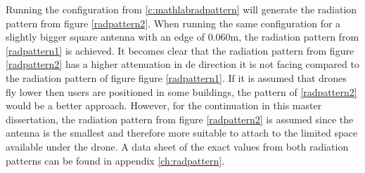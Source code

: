 Running the configuration from \ref{c:mathlabradpattern} will generate the radiation pattern from figure \ref{radpattern2}.
When running the same configuration for a slightly bigger square antenna with an edge of 0.060m, the radiation pattern from \ref{radpattern1} is
achieved. It becomes clear that the radiation pattern from figure \ref{radpattern2} has a higher attenuation in de direction it is not facing compared to
the radiation pattern of figure figure \ref{radpattern1}. If it is assumed that drones fly lower then users are positioned in some buildings, the pattern of \ref{radpattern2}
would be a better approach. However, for the continuation in this master dissertation, the radiation pattern from figure \ref{radpattern2} is assumed since the antenna is the smallest
and therefore more suitable to attach to the limited space available under the drone. A data sheet of the exact values from both radiation patterns can be
found in appendix \ref{ch:radpattern}.

